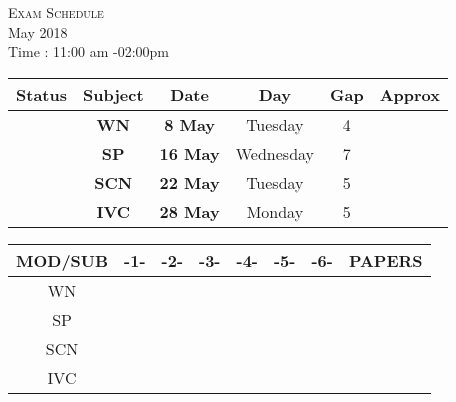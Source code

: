 \documentclass[12pt]{article}
\begin{document}
	\begin{center}
		\vspace*{1cm}
			\Huge{\textsc{Exam Schedule}}\\
			\huge{\sc May 2018}\\
			\Large{ Time : 11:00 am -02:00pm}\\
			\vfill
	\begin{tabular}{|c|c|c|c|c|c|}
	\hline 
	\textbf{Status} &\textbf{Subjec}t & \textbf{Date} & \textbf{Day} & \textbf{Gap} & \textbf{Approx} \\ 
	\hline 
	&\textbf{WN} & \textbf{8 May} & Tuesday   & 4 & \\ 
	\hline 
	&\textbf{SP} & \textbf{16 May} & Wednesday  & 7& \\ 
	\hline 
	&\textbf{SCN} & \textbf{22 May} & Tuesday  & 5 &\\ 
	\hline 
	&\textbf{IVC} & \textbf{28 May} & Monday  & 5& \\ 
	\hline 
	\end{tabular} 
	\vfill
	\end{center}
	
	\begin{center}
		\Large
		\begin{tabular}{|c|c|c|c|c|c|c|c|}
		\hline 
		\textbf{MOD/SUB} & \textbf{-1-} & \textbf{-2-} & \textbf{-3-} & \textbf{-4-} & \textbf{-5-} & \textbf{-6-} & \textbf{PAPERS} \\ 
		\hline 
		WN &  &  &  &  &  &  &  \\ 
		\hline 
		SP &  &  &  &  &  &  &  \\ 
		\hline 
		SCN &  &  &  &  &  &  &  \\ 
		\hline 
		IVC &  &  &  &  &  &  &  \\ 
		\hline 
		\end{tabular} 
		\vfill
	\end{center}	
	

	
\end{document}
